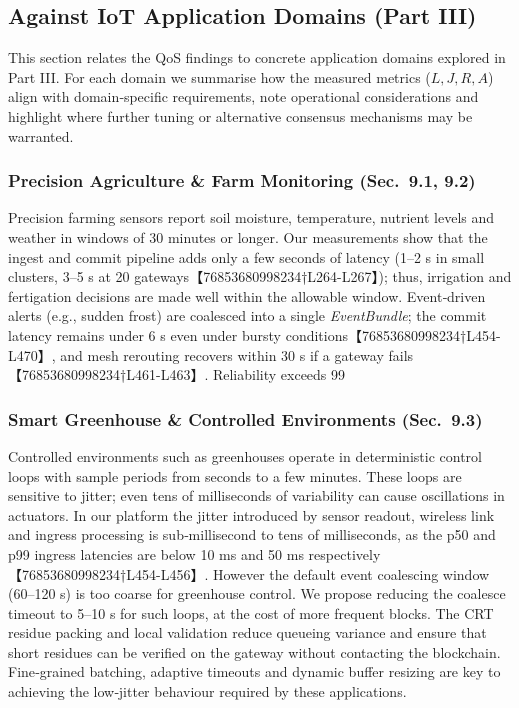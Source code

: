\documentclass[12pt,onecolumn]{IEEEtran} %
\begin{document}
\subsection{Against IoT Application Domains (Part III)}
\label{subsec:domains}

This section relates the QoS findings to concrete application domains explored in Part III.  For each domain we summarise how the measured metrics (\(L,J,R,A\)) align with domain‑specific requirements, note operational considerations and highlight where further tuning or alternative consensus mechanisms may be warranted.

\subsubsection{Precision Agriculture \& Farm Monitoring (Sec.~9.1, 9.2)}
Precision farming sensors report soil moisture, temperature, nutrient levels and weather in windows of 30 minutes or longer.  Our measurements show that the ingest and commit pipeline adds only a few seconds of latency (1–2 s in small clusters, 3–5 s at 20 gateways【76853680998234†L264-L267】); thus, irrigation and fertigation decisions are made well within the allowable window.  Event‑driven alerts (e.g., sudden frost) are coalesced into a single \emph{EventBundle}; the commit latency remains under 6 s even under bursty conditions【76853680998234†L454-L470】, and mesh rerouting recovers within 30 s if a gateway fails【76853680998234†L461-L463】.  Reliability exceeds 99 %

\subsubsection{Smart Greenhouse \& Controlled Environments (Sec.~9.3)}
Controlled environments such as greenhouses operate in deterministic control loops with sample periods from seconds to a few minutes.  These loops are sensitive to jitter; even tens of milliseconds of variability can cause oscillations in actuators.  In our platform the jitter introduced by sensor readout, wireless link and ingress processing is sub‑millisecond to tens of milliseconds, as the p50 and p99 ingress latencies are below 10 ms and 50 ms respectively【76853680998234†L454-L456】.  However the default event coalescing window (60–120 s) is too coarse for greenhouse control.  We propose reducing the coalesce timeout to 5–10 s for such loops, at the cost of more frequent blocks.  The CRT residue packing and local validation reduce queueing variance and ensure that short residues can be verified on the gateway without contacting the blockchain.  Fine‑grained batching, adaptive timeouts and dynamic buffer resizing are key to achieving the low‑jitter behaviour required by these applications.
\end{document}
